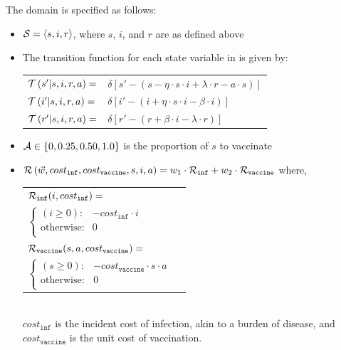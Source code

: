 The domain is specified as follows:
\begin{itemize}
    \item {\footnotesize $ \mathcal{S} = \left\langle s, i, r \right\rangle$}, where $ s $, $ i $, and $ r $ are as defined above
    \item The transition function {\footnotesize \Transition} for each state variable in {\footnotesize \State} is given by:    \\
    {\footnotesize 
        \abovedisplayskip=5pt
        \belowdisplayskip=0pt
        \renewcommand{\arraystretch}{1.5}
        \begin{tabular}{ll}
            $ \mathcal{T}\left( s' | s, i, r, a \right) =$ & $ \delta \left[ s' - (s - \eta \cdot s \cdot i + \lambda \cdot r -a \cdot s) \right] $ \\
            $ \mathcal{T}\left( i' | s, i, r, a \right) =$ & $ \delta \left[ i' - (i + \eta \cdot s \cdot i - \beta \cdot i) \right] $ \\
            $ \mathcal{T}\left( r' | s, i, r, a \right) =$ & $ \delta \left[ r' - (r + \beta \cdot i - \lambda \cdot r) \right] $ \\            
        \end{tabular}
    }%
    \item {\footnotesize $ \mathcal{A} \in \left\lbrace 0, 0.25, 0.50, 1.0 \right\rbrace $} is the proportion of $ s $ to vaccinate 
    \item {\footnotesize $ \mathcal{R}\left(\vec{w}, cost_{\mathtt{inf}}, cost_{\mathtt{vaccine}}, s, i, a \right) = w_1 \cdot \mathcal{R}_{\mathtt{inf}} + w_2 \cdot \mathcal{R}_{\mathtt{vaccine}}$} where, \\
    {\footnotesize 
        \abovedisplayskip=10pt
        \belowdisplayskip=0pt
        \renewcommand{\arraystretch}{1.5}
        \begin{tabular}{ll}    
            $ \mathcal{R}_{\mathtt{inf}}(i, cost_{\mathtt{inf}}) = $ &  $ $ \\
            \qquad $ \begin{cases}
            (i \geq 0) : & -cost_{\mathtt{inf}} \cdot i \\
            \text{otherwise} : & 0 \\
            \end{cases} $ & $ $ \\
            $ \mathcal{R}_{\mathtt{vaccine}}(s, a, cost_{\mathtt{vaccine}}) = $ &  $ $ \\
            \qquad $ \begin{cases}
            (s \geq 0) : & -cost_{\mathtt{vaccine}} \cdot s \cdot a \\
            \text{otherwise} : & 0 \\
            \end{cases} $ & $ $ \\
        \end{tabular}
    } \\
    {\footnotesize $ cost_{\mathtt{inf}} $} is the incident cost of infection, akin to a burden of disease, and {\footnotesize $ cost_{\mathtt{vaccine}} $} is the unit cost of vaccination.    
\end{itemize} 

